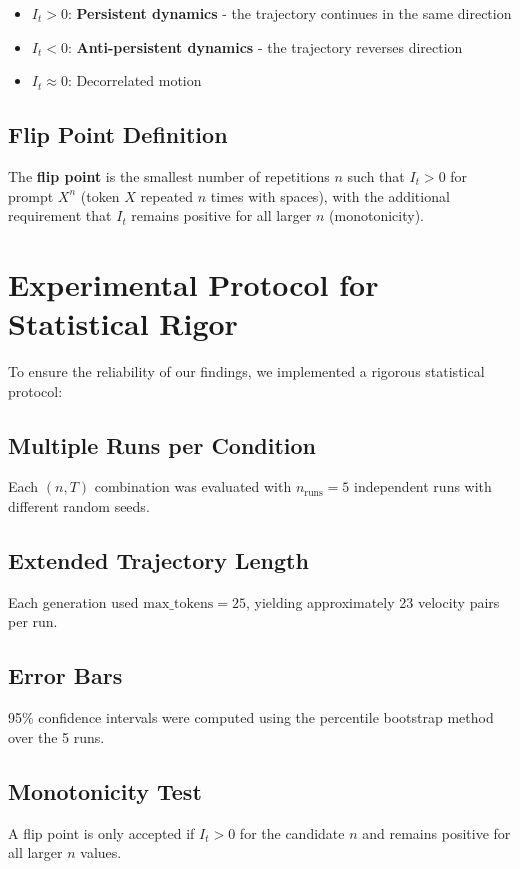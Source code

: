 \documentclass[12pt,a4paper]{article}
\begin{document}
\begin{itemize}[noitemsep]
    \item $I_t > 0$: \textbf{Persistent dynamics} - the trajectory continues in the same direction
    \item $I_t < 0$: \textbf{Anti-persistent dynamics} - the trajectory reverses direction
    \item $I_t \approx 0$: Decorrelated motion
\end{itemize}

\subsection{Flip Point Definition}

The \textbf{flip point} is the smallest number of repetitions $n$ such that $I_t > 0$ for prompt $X^n$ (token $X$ repeated $n$ times with spaces), with the additional requirement that $I_t$ remains positive for all larger $n$ (monotonicity).

\section{Experimental Protocol for Statistical Rigor}

To ensure the reliability of our findings, we implemented a rigorous statistical protocol:

\subsection{Multiple Runs per Condition}
Each $(n, T)$ combination was evaluated with $n_{\text{runs}} = 5$ independent runs with different random seeds.

\subsection{Extended Trajectory Length}
Each generation used $\text{max\_tokens} = 25$, yielding approximately 23 velocity pairs per run.

\subsection{Error Bars}
95\% confidence intervals were computed using the percentile bootstrap method over the 5 runs.

\subsection{Monotonicity Test}
A flip point is only accepted if $I_t > 0$ for the candidate $n$ and remains positive for all larger $n$ values.
\end{document}
